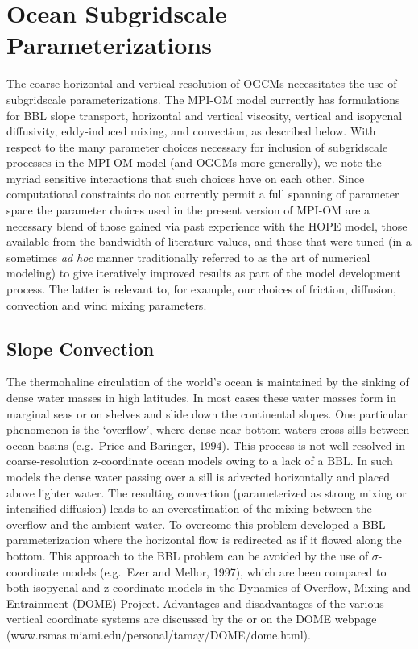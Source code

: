\section{Ocean Subgridscale Parameterizations}
\label{sec:subgrid}

The coarse horizontal and vertical resolution of OGCMs necessitates the use
of subgridscale parameterizations. The \mbox{MPI-OM} model currently has formulations
for BBL slope transport, 
horizontal and vertical viscosity, 
vertical and isopycnal diffusivity, 
eddy-induced mixing,
and convection, as described below.
With respect to the many parameter choices necessary for inclusion
of subgridscale processes in the \mbox{MPI-OM} model (and OGCMs more generally),
we note the myriad sensitive interactions that such choices have on each other.
Since computational constraints do not currently permit a full spanning
of parameter space
the parameter choices used in the present version of \mbox{MPI-OM}
are a necessary blend of those gained via past experience with the HOPE model,
those available from the bandwidth of literature values,
and those that were tuned (in a sometimes {\em ad hoc} manner
traditionally referred to as the art of numerical modeling)
to give iteratively improved results as part of the model development process.
The latter is relevant to, for example, our choices of friction, diffusion, convection
and wind mixing parameters.

\subsection{Slope Convection}
\label{sec:bbl}
The thermohaline circulation of the world's ocean is maintained by the sinking of dense
water masses in high latitudes. In most cases these water masses form in marginal
seas or on shelves and slide down the continental slopes. One particular
phenomenon is the `overflow', where dense near-bottom waters cross sills between
ocean basins (e.g.\ Price and Baringer, 1994).\nocite{price94}
This process is not well resolved
in coarse-resolution z-coordinate ocean models owing to a lack of a BBL.
In such models the dense water passing over a sill is advected
horizontally and placed above lighter water. The resulting convection (parameterized
as strong mixing or intensified diffusion) leads to an overestimation of the
mixing between the overflow and the ambient water.
To overcome this problem \citet{beckmann97} developed a BBL
parameterization where the horizontal flow is redirected as if it flowed along
the bottom. 
This approach to the BBL problem can be avoided 
by the use of $\sigma$-coordinate models (e.g.\ Ezer and Mellor, 1997),\nocite{ezer97}
which are been compared to both isopycnal and z-coordinate models in 
the Dynamics of Overflow, Mixing and Entrainment (DOME) Project. 
Advantages and disadvantages of the various vertical coordinate systems are discussed 
by the \citet{dynamo97} or on the DOME webpage 
(www.rsmas.miami.edu/personal/tamay/DOME/dome.html).

